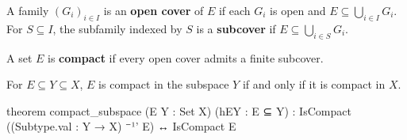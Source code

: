 \begin{definition}
  \label{an1:def:open-cover}
  A family $(G_i)_{i\in I}$ is an \textbf{open cover} of $E$ if each $G_i$ is open and
  $E\subseteq\bigcup_{i\in I}G_i$.
  For $S\subseteq I$, the subfamily indexed by $S$ is a \textbf{subcover} if
  $E\subseteq\bigcup_{i\in S}G_i$.
\end{definition}

\begin{definition}
  \label{an1:def:compact}
  A set $E$ is \textbf{compact} if every open cover admits a finite subcover.
\end{definition}

\begin{proposition}
  \label{an1:thm:compactness-preserved-under-subspace}
  For $E\subseteq Y\subseteq X$, $E$ is compact in the subspace $Y$ if and only if it is compact
  in $X$.

  \begin{lean}
    theorem compact_subspace (E Y : Set X) (hEY : E ⊆ Y) :
        IsCompact ((Subtype.val : Y → X) ⁻¹' E) ↔ IsCompact E
  \end{lean}
\end{proposition}

